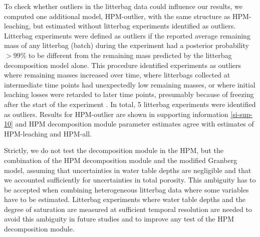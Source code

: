 \documentclass[esd, manuscript]{copernicus}
\begin{document}
To check whether outliers in the litterbag data could influence our results, we computed one additional model, HPM-outlier, with the same structure as HPM-leaching, but estimated without litterbag experiments identified as outliers. Litterbag experiments were defined as outliers if the reported average remaining mass of any litterbag (batch) during the experiment had a posterior probability \(>99\)\% to be different from the remaining mass predicted by the litterbag decomposition model alone. This procedure identified experiments as outliers where remaining masses increased over time, where litterbags collected at intermediate time points had unexpectedly low remaining masses, or where initial leaching losses were retarded to later time points, presumably because of freezing after the start of the experiment \citep{Teickner.2025}. In total, 5 litterbag experiments were identified as outliers. Results for HPM-outlier are shown in supporting information \ref{si-sup-10} and HPM decomposition module parameter estimates agree with estimates of HPM-leaching and HPM-all.

Strictly, we do not test the decomposition module in the HPM, but the combination of the HPM decomposition module and the modified Granberg model, assuming that uncertainties in water table depths are negligible and that we accounted sufficiently for uncertainties in total porosity. This ambiguity has to be accepted when combining heterogeneous litterbag data where some variables have to be estimated. Litterbag experiments where water table depths and the degree of saturation are measured at sufficient temporal resolution are needed to avoid this ambiguity in future studies and to improve any test of the HPM decomposition module.
\end{document}
